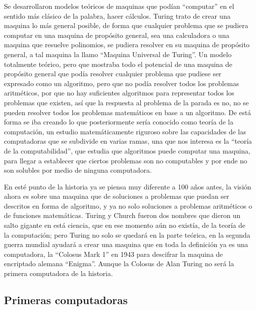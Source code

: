 \documentclass[letterpaper,12pt,oneside]{book}
\begin{document}
		Se desarrollaron modelos teóricos de maquinas que podían ``computar'' en el sentido más clásico de la palabra, hacer cálculos. Turing trato de crear
		una maquina lo más general posible, de forma que cualquier problema que se pudiera computar en una maquina de propósito general, sea una calculadora
		o una maquina que resuelve polinomios, se pudiera resolver en su maquina de propósito general, a tal maquina la llamo ``Maquina Universal de Turing''. Un modelo
		totalmente teórico, pero que mostraba todo el potencial de una maquina de propósito general que podía resolver cualquier problema que pudiese ser expresado
		como un algoritmo, pero que no podía resolver todos los problemas aritméticos, por que no hay suficientes algoritmos para representar todos los
		problemas que existen, así que la respuesta al problema de la parada es no, no se pueden resolver todos los problemas matemáticos en base
		a un algoritmo. De está forma se iba creando lo que posteriormente sería conocido como teoría de la computación, un estudio matemáticamente riguroso
		sobre las capacidades de las computadoras que se subdivide en varias ramas, una que nos interesa es la ``teoría de la computabilidad'', que estudia
		que algoritmos puede computar una maquina, para llegar a establecer que ciertos problemas son no computables y por ende no son solubles por medio de
		ninguna computadora.
		
		En esté punto de la historia ya se piensa muy diferente a 100 años antes, la visión ahora es sobre una maquina que de soluciones a problemas que
		puedan ser descritos en forma de algoritmo, y ya no solo soluciones a problemas aritméticos o de funciones matemáticas. Turing y Church
		fueron dos nombres que dieron un salto gigante en está ciencia, que en ese momento aún no existía, de la teoría de la computación; pero
		Turing no solo se quedará en la parte teórica, en la segunda guerra mundial ayudará a crear una maquina que en toda la definición
		ya es una computadora, la ``Colosus Mark 1'' en 1943 para descifrar la maquina de encriptado alemana ``Enigma''. Aunque la Colosus de Alan Turing
		no será la primera computadora de la historia.
		
		\clearpage		
		
		\subsection{Primeras computadoras}
		
\end{document}
